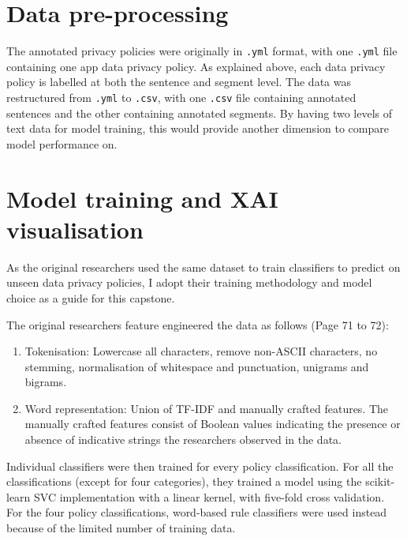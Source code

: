 \section{Data pre-processing}
The annotated privacy policies were originally in \texttt{.yml} format, with one \texttt{.yml} file containing one app data privacy policy. As explained above, each data privacy policy is labelled at both the sentence and segment level. The data was restructured from \texttt{.yml} to \texttt{.csv}, with one \texttt{.csv} file containing annotated sentences and the other containing annotated segments. By having two levels of text data for model training, this would provide another dimension to compare model performance on.


\section{Model training and XAI visualisation}

As the original researchers used the same dataset to train classifiers to predict on unseen data privacy policies, I adopt their training methodology and model choice as a guide for this capstone. 

The original researchers feature engineered the data as follows (Page 71 to 72): 

\begin{enumerate}
	\item Tokenisation: Lowercase all characters, remove non-ASCII characters, no stemming, normalisation of whitespace and punctuation, unigrams and bigrams.
	\item Word representation: Union of TF-IDF and manually crafted features. The manually crafted features consist of Boolean values indicating the presence or absence of indicative strings the researchers observed in the data.
\end{enumerate}

Individual classifiers were then trained for every policy classification. For all the classifications (except for four categories), they trained a model using the scikit-learn SVC implementation with a linear kernel, with five-fold cross validation. For the four policy classifications, word-based rule classifiers were used instead because of the limited number of training data.

